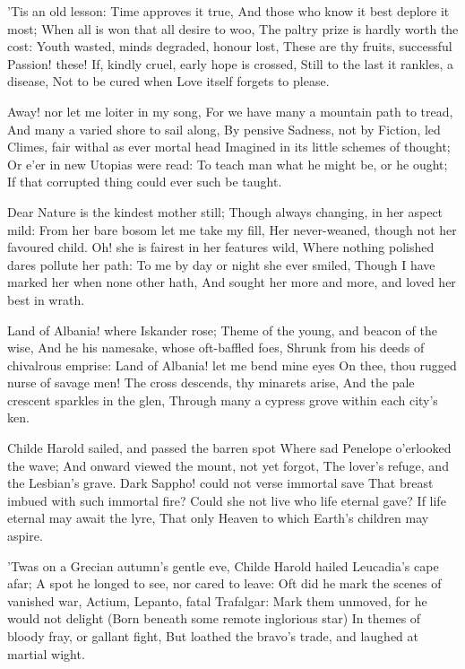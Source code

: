 \documentclass[10pt,twocolumn]{book}
\begin{document}
   'Tis an old lesson:  Time approves it true,
   And those who know it best deplore it most;
   When all is won that all desire to woo,
   The paltry prize is hardly worth the cost:
   Youth wasted, minds degraded, honour lost,
   These are thy fruits, successful Passion! these!
   If, kindly cruel, early hope is crossed,
   Still to the last it rankles, a disease,
Not to be cured when Love itself forgets to please.


   Away! nor let me loiter in my song,
   For we have many a mountain path to tread,
   And many a varied shore to sail along,
   By pensive Sadness, not by Fiction, led\textemdash
   Climes, fair withal as ever mortal head
   Imagined in its little schemes of thought;
   Or e'er in new Utopias were read:
   To teach man what he might be, or he ought;
If that corrupted thing could ever such be taught.


   Dear Nature is the kindest mother still;
   Though always changing, in her aspect mild:
   From her bare bosom let me take my fill,
   Her never-weaned, though not her favoured child.
   Oh! she is fairest in her features wild,
   Where nothing polished dares pollute her path:
   To me by day or night she ever smiled,
   Though I have marked her when none other hath,
And sought her more and more, and loved her best in wrath.


   Land of Albania! where Iskander rose;
   Theme of the young, and beacon of the wise,
   And he his namesake, whose oft-baffled foes,
   Shrunk from his deeds of chivalrous emprise:
   Land of Albania! let me bend mine eyes
   On thee, thou rugged nurse of savage men!
   The cross descends, thy minarets arise,
   And the pale crescent sparkles in the glen,
Through many a cypress grove within each city's ken.


   Childe Harold sailed, and passed the barren spot
   Where sad Penelope o'erlooked the wave;
   And onward viewed the mount, not yet forgot,
   The lover's refuge, and the Lesbian's grave.
   Dark Sappho! could not verse immortal save
   That breast imbued with such immortal fire?
   Could she not live who life eternal gave?
   If life eternal may await the lyre,
That only Heaven to which Earth's children may aspire.


   'Twas on a Grecian autumn's gentle eve,
   Childe Harold hailed Leucadia's cape afar;
   A spot he longed to see, nor cared to leave:
   Oft did he mark the scenes of vanished war,
   Actium, Lepanto, fatal Trafalgar:
   Mark them unmoved, for he would not delight
   (Born beneath some remote inglorious star)
   In themes of bloody fray, or gallant fight,
But loathed the bravo's trade, and laughed at martial wight.
\end{document}
